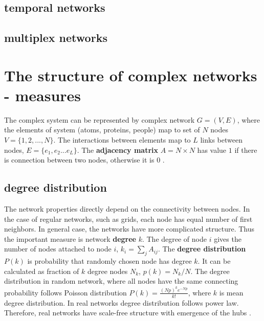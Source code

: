 \subsection{temporal networks}

\subsection{multiplex networks}



\section{The structure of complex networks - measures}

The complex system can be represented by complex network $G=(V, E)$, where the elements of system (atoms, proteins, people) map to set of $N$ nodes $V=\{1, 2, ...,N\}$. The interactions between elements map to $L$ links between nodes, $E = \{ e_1, e_2... e_L\}$. The \textbf{adjacency matrix} ${A} = N \times N$ has value $1$ if there is connection between two nodes, otherwise it is $0$ \cite{boccaletti2006}. 

\subsection{degree distribution}

The network properties directly depend on the connectivity between nodes. In the case of regular networks, such as grids, each node has equal number of first neighbors. In general case, the networks have more complicated structure. Thus the important measure is network \textbf{degree} $k$. The degree of node $i$ gives the number of nodes attached to node $i$, $k_i = \sum_j A_{ij}$. The \textbf{degree distribution} $P(k)$ is probability that randomly chosen node has degree $k$. It can be calculated as fraction of $k$ degree nodes $N_k$, $p(k) = N_k/N$. The degree distribution in random network, where all nodes have the same connecting probability follows Poisson distribution $P(k)= \frac{(Np)^ke^{-Np}}{k!}$, where $k$ is mean degree distribution. In real networks degree distribution follows power law. Therefore, real networks have scale-free structure with emergence of the hubs \cite{newman2010}.

